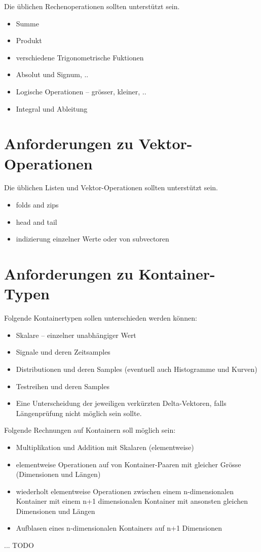 \documentclass[11pt]{article}
\begin{document}
Die \"ublichen Rechenoperationen sollten unterst\"utzt sein.
\begin{itemize}
\item Summe
\item Produkt
\item verschiedene Trigonometrische Fuktionen
\item Absolut und Signum, ..
\item Logische Operationen -- gr\"osser, kleiner, ..
\item Integral und Ableitung
\end{itemize}

\section{Anforderungen zu Vektor-Operationen}
Die \"ublichen Listen und Vektor-Operationen sollten unterst\"utzt sein.

\begin{itemize}
\item folds and zips
\item head and tail
\item indizierung einzelner Werte oder von subvectoren
\end{itemize}

\section{Anforderungen zu Kontainer-Typen}

Folgende Kontainertypen sollen unterschieden werden k\"onnen:

\begin{itemize}
\item Skalare -- einzelner unabh\"angiger Wert
\item Signale und deren Zeitsamples
\item Distributionen und deren Samples (eventuell auch Histogramme und Kurven)  
\item Testreihen und deren Samples
\item Eine Unterscheidung der jeweiligen verk\"urzten Delta-Vektoren, falls L\"angenpr\"ufung nicht m\"oglich sein sollte.
\end{itemize}

Folgende Rechnungen auf Kontainern soll m\"oglich sein:
\begin{itemize}
\item Multiplikation und Addition mit Skalaren (elementweise) 
\item elementweise Operationen auf von Kontainer-Paaren mit gleicher Gr\"osse (Dimensionen und L\"angen)
\item wiederholt elementweise Operationen zwischen einem n-dimensionalen Kontainer mit einem n+1 dimensionalen 
Kontainer mit ansonsten gleichen Dimensionen und L\"angen
\item Aufblasen eines n-dimensionalen Kontainers auf n+1 Dimensionen 
\end{itemize} 
... TODO 
\end{document}
